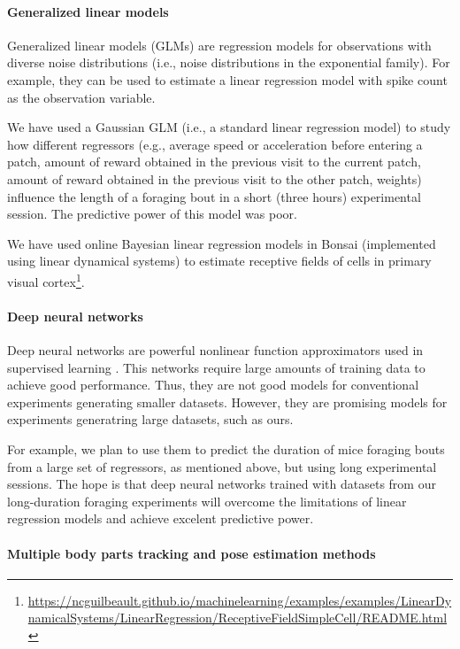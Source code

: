 \paragraph{Generalized linear models}

Generalized linear models (GLMs) are regression models for observations with diverse
noise distributions (i.e., noise distributions in the exponential family). For
example, they can be used to estimate a linear regression model with spike
count as the observation variable.

We have used a Gaussian GLM (i.e., a standard linear regression model) to
study how different regressors (e.g., average speed or acceleration
before entering a patch, amount of reward obtained in the previous visit to the
current patch, amount of reward obtained in the previous visit to the other
patch, weights) influence the length of a foraging bout in a short (three
hours) experimental session. The predictive power of this model was poor.

We have used online Bayesian linear regression models in Bonsai (implemented
using linear dynamical systems) to estimate
receptive fields of cells in primary visual
cortex\footnote{\url{https://ncguilbeault.github.io/machinelearning/examples/examples/LinearDynamicalSystems/LinearRegression/ReceptiveFieldSimpleCell/README.html}}.

\paragraph{Deep neural networks}

Deep neural networks are powerful nonlinear function approximators used in
supervised learning \citep{goodfellowEtAl16}. This networks require large
amounts of training data to achieve good performance. Thus, they are not good
models for conventional experiments generating smaller datasets. However, they
are promising models for experiments generatring large datasets, such as ours.

For example, we plan to use them to predict the duration of mice foraging bouts from a
large set of regressors, as mentioned above, but using long experimental
sessions. The hope is that deep neural networks trained with datasets
from our long-duration foraging experiments will overcome the limitations of
linear regression models and achieve excelent predictive power.

\paragraph{Multiple body parts tracking and pose estimation methods}

